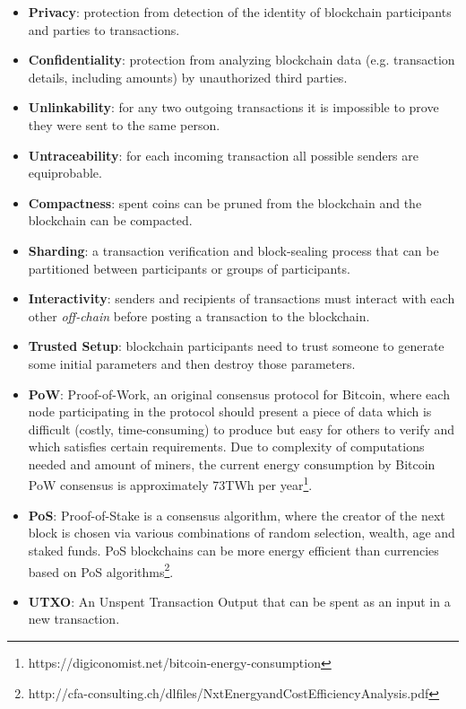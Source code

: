 \documentclass[a4paper, 10pt, conference]{ieeeconf}
\begin{document}
\begin{itemize}
	\item \textbf{Privacy}: protection from detection of the identity of blockchain participants and parties to transactions.
	\item \textbf{Confidentiality}: protection from analyzing blockchain data (e.g. transaction details, including amounts) by unauthorized third parties.
	\item \textbf{Unlinkability}: for any two outgoing transactions it is impossible to prove they were sent to the same person\cite{c2}.
	\item \textbf{Untraceability}: for each incoming transaction all possible senders are equiprobable\cite{c2}.
	\item \textbf{Compactness}: spent coins can be pruned from the blockchain and the blockchain can be compacted.
	\item \textbf{Sharding}: a transaction verification and block-sealing process that can be partitioned between participants or groups of participants.
	\item \textbf{Interactivity}: senders and recipients of transactions must interact with each other \textit{off-chain} before posting a transaction to the blockchain.
	\item \textbf{Trusted Setup}: blockchain participants need to trust someone to generate some initial parameters and then destroy those parameters.
	\item \textbf{PoW}: Proof-of-Work, an original consensus protocol for Bitcoin, where each node participating in the protocol should present a piece of data which is difficult (costly, time-consuming) to produce but easy for others to verify and which satisfies certain requirements. Due to complexity of computations needed and amount of miners, the current energy consumption by Bitcoin PoW consensus is approximately 73TWh per year\footnote{https://digiconomist.net/bitcoin-energy-consumption}.
	\item \textbf{PoS}: Proof-of-Stake is a consensus algorithm, where the creator of the next block is chosen via various combinations of random selection, wealth, age and staked funds. PoS blockchains can be more energy efficient than currencies based on PoS algorithms\footnote{http://cfa-consulting.ch/dlfiles/NxtEnergyandCostEfficiencyAnalysis.pdf}.
	\item \textbf{UTXO}: An Unspent Transaction Output that can be spent as an input in a new transaction.
\end{itemize}
\end{document}
